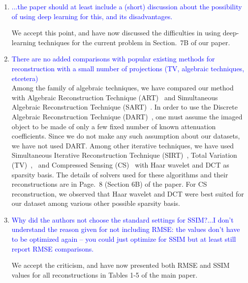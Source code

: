 \documentclass{article}
\begin{document}
 \begin{enumerate}
 \item    \textcolor{blue}{...the paper should at least include a (short) discussion about the
     possibility of using deep learning for this, and its disadvantages.}

   We accept this point, and have now discussed the difficulties in
   using deep-learning techniques for the current problem in Section.~7B
   of our paper. 

\item \textcolor{blue}{There are no added comparisons with popular existing methods for
  reconstruction with a small number of projections (TV, algebraic techniques, etcetera)}\\
  
 Among the family of algebraic techniques, we have compared our method
 with Algebraic Reconstruction Technique (ART)~\cite{art} and Simultaneous
 Algebraic Reconstruction Technique (SART)~\cite{sart}. In order to use the Discrete Algebraic Reconstruction Technique (DART)~\cite{dart}, one must assume the imaged object to be made of only a few fixed number of known attenuation coefficients. Since we do not make any such assumption about  our datasets, we have not used DART. %
 Among other iterative techniques, we
 have used Simultaneous Iterative Reconstruction Technique (SIRT)~\cite{sirt},
 Total Variation (TV)~\cite{TV},~\cite{TVReg} and Compressed Sensing (CS)~\cite{lasso} with Haar wavelet
 and DCT as sparsity basis. The details of solvers used for these
 algorithms and their reconstructions are in Page.~8 (Section 6B) of
 the paper. For CS reconstruction, we observed that Haar wavelet and
 DCT were best suited for our dataset among various other possible
 sparsity basis.

\item \textcolor{blue}{Why did the authors not choose the standard
  settings for SSIM?...I don’t understand the reason given for not
  including RMSE: the values don’t have to be optimized again -- you
  could just optimize for SSIM but at least still report RMSE
  comparisons.}

We accept the criticism, and have now presented both RMSE and SSIM
values for all reconstructions in Tables 1-5 of the main paper. 
  \begin{comment}
Since
RMSE corresponds to error in intensity values, we have used SSIM with
a higher weightage to structure for the purpose of measuring error in
preservation of structures in our reconstructions.


\end{comment}
\end{enumerate}
\end{document}
